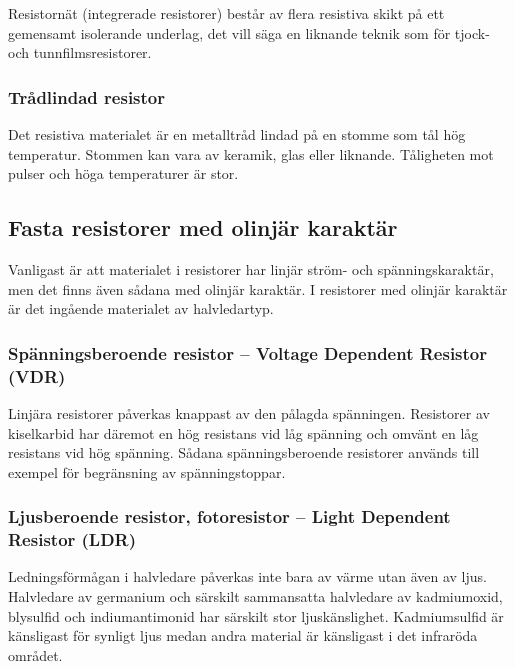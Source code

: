 Resistornät (integrerade resistorer) består av flera resistiva skikt på ett
gemensamt isolerande underlag, det vill säga en liknande teknik som för tjock- 
och tunnfilmsresistorer.

\subsubsection{Trådlindad resistor}

Det resistiva materialet är en metalltråd lindad på en stomme som tål hög
temperatur.
Stommen kan vara av keramik, glas eller liknande.
Tåligheten mot pulser och höga temperaturer är stor.

\newpage %

\subsection{Fasta resistorer med olinjär karaktär}
\label{fasta_resistorer_olinjära}

Vanligast är att materialet i resistorer har linjär ström- och
spänningskaraktär, men det finns även sådana med olinjär karaktär.
I resistorer med olinjär karaktär är det ingående materialet av halvledartyp.

\subsubsection{Spänningsberoende resistor -- Voltage Dependent Resistor (VDR)}

Linjära resistorer påverkas knappast av den pålagda spänningen.
Resistorer av kiselkarbid har däremot en hög resistans vid låg spänning och
omvänt en låg resistans vid hög spänning.
Sådana spänningsberoende resistorer används till exempel för begränsning av
spänningstoppar.

\subsubsection{Ljusberoende resistor, fotoresistor -- Light Dependent Resistor (LDR)}

Ledningsförmågan i halvledare påverkas inte bara av värme utan även av ljus.
Halvledare av germanium och särskilt sammansatta halvledare av kadmiumoxid,
blysulfid och indiumantimonid har särskilt stor ljuskänslighet. Kadmiumsulfid
är känsligast för synligt ljus medan andra material är känsligast i det
infraröda området.

